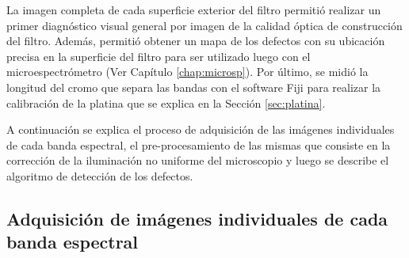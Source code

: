 La imagen completa de cada superficie exterior del filtro permitió realizar un primer diagnóstico visual general por imagen de la calidad óptica de construcción del filtro. Además, permitió obtener un mapa de los defectos con su ubicación precisa en la superficie del filtro para ser utilizado luego con el microespectrómetro (Ver Capítulo \ref{chap:microsp}). Por último, se midió la longitud del cromo que separa las bandas con el software Fiji para realizar la calibración de la platina que se explica en la Sección \ref{sec:platina}.

A continuación se explica el proceso de adquisición de las imágenes individuales de cada banda espectral, el pre-procesamiento de las mismas que consiste en la corrección de la iluminación no uniforme del microscopio y luego se describe el algoritmo de detección de los defectos.

\singlespacing
\subsection{Adquisición de imágenes individuales de cada banda espectral}
\label{sec:cadab}


